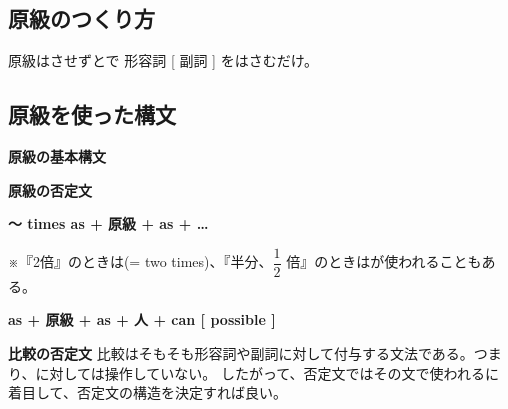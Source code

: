 \enlargethispage{1\baselineskip}
\subsection{原級のつくり方}\vspace{-0.35em}
    原級はさせずとで 形容詞 [ 副詞 ] をはさむだけ。

\subsection{原級を使った構文}\vspace{-0.45em}
    \begin{theorembox}{\textbf{原級の基本構文}}
    \end{theorembox}
    \vspace{0.25em}

    \begin{theorembox}{\textbf{原級の否定文}}
    \end{theorembox}
    \vspace{0.25em}

    \begin{theorembox}{\textbf{〜 times as + 原級 + as + …}}
    \end{theorembox}
    \vspace{0.15em}

    ※『2倍』のときは(= two times)、『半分、$\dfrac{1}{2}$ 倍』のときはが使われることもある。

    \begin{theorembox}{\textbf{as + 原級 + as + 人 + can [ possible ]}}
    \end{theorembox}
    \vspace{0.2em}

    \begin{techniquebox}{\textbf{比較の否定文}}
        比較はそもそも形容詞や副詞に対して付与する文法である。つまり、に対しては操作していない。
        したがって、否定文ではその文で使われるに着目して、否定文の構造を決定すれば良い。
    \end{techniquebox}
    \vspace{-1em}

